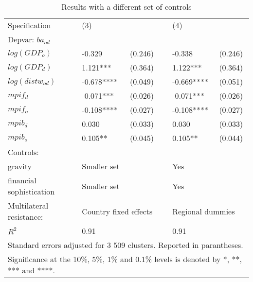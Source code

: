 \documentclass[12pt,a4paper]{article}
\begin{document}
\begin{table}[!h]
\centering
\begin{tabular}{ l l l l l l}
\hline
Specification&(3)&&&(4)& \\
Depvar: $ba_{od}$&&&&&\\
\hline
$log(GDP_{o})$&-0.329&(0.246)&&-0.338&(0.246)\\
$log(GDP_{d})$&1.121***&(0.364)&&1.122***&(0.364)\\
$log(distw_{od})$&-0.678****&(0.049)&&-0.669****&(0.051)\\
$mpif_{d}$&-0.071***&(0.026)&&-0.071***&(0.026)\\
$mpif_{o}$&-0.108****&(0.027)&&-0.108****&(0.027)\\
$mpib_{d}$&0.030&(0.033)&&0.030&(0.033)\\
$mpib_{o}$&0.105**&(0.045)&&0.105**&(0.044)\\
Controls:&&&&&\\
gravity &Smaller set&&&Yes& \\ 
financial sophistication &Smaller set&&&Yes& \\
Multilateral resistance: & \multicolumn{2}{l}{Country fixed effects} && \multicolumn{2}{l}{Regional dummies} \\
\hline
$R^2$&0.91&&&0.91&\\
\hline
\multicolumn{6}{l}{Standard errors adjusted for 3 509 clusters. Reported in parantheses. }\\
\hline
\multicolumn{6}{l}{\footnotesize Significance at the 10\%, 5\%, 1\% and 0.1\% levels is denoted by *, **, *** and ****.}\\
\end{tabular}
\caption{Results with a different set of controls}
\label{tab:robust1}
\end{table}
\end{document}
